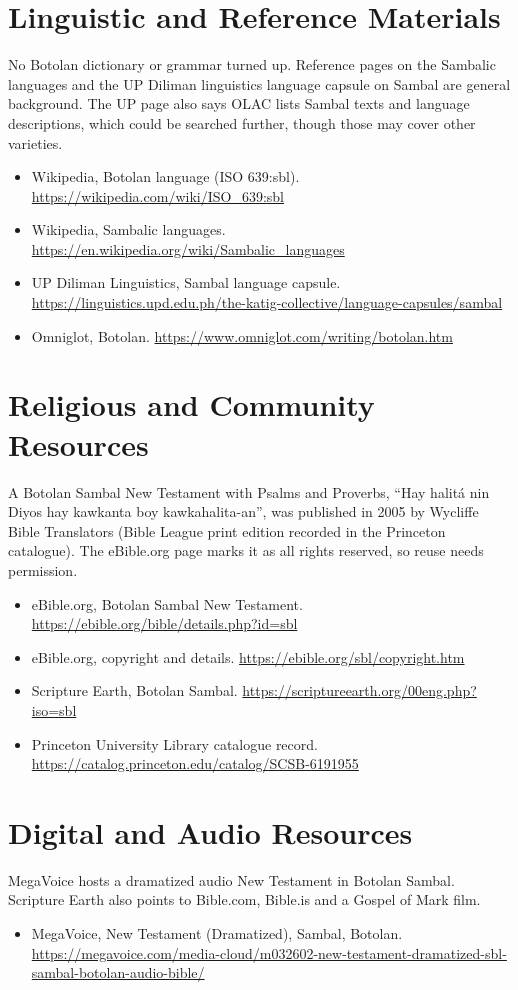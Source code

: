 \documentclass[12pt]{article}
\begin{document}
\section{Linguistic and Reference Materials}
No Botolan dictionary or grammar turned up. Reference pages on the Sambalic languages and the UP Diliman linguistics language capsule on Sambal are general background. The UP page also says OLAC lists Sambal texts and language descriptions, which could be searched further, though those may cover other varieties.
\begin{itemize}
\item Wikipedia, Botolan language (ISO 639:sbl). \url{https://wikipedia.com/wiki/ISO_639:sbl}
\item Wikipedia, Sambalic languages. \url{https://en.wikipedia.org/wiki/Sambalic_languages}
\item UP Diliman Linguistics, Sambal language capsule. \url{https://linguistics.upd.edu.ph/the-katig-collective/language-capsules/sambal}
\item Omniglot, Botolan. \url{https://www.omniglot.com/writing/botolan.htm}
\end{itemize}

\section{Religious and Community Resources}
A Botolan Sambal New Testament with Psalms and Proverbs, ``Hay halit\'a nin Diyos hay kawkanta boy kawkahalita-an'', was published in 2005 by Wycliffe Bible Translators (Bible League print edition recorded in the Princeton catalogue). The eBible.org page marks it as all rights reserved, so reuse needs permission.
\begin{itemize}
\item eBible.org, Botolan Sambal New Testament. \url{https://ebible.org/bible/details.php?id=sbl}
\item eBible.org, copyright and details. \url{https://ebible.org/sbl/copyright.htm}
\item Scripture Earth, Botolan Sambal. \url{https://scriptureearth.org/00eng.php?iso=sbl}
\item Princeton University Library catalogue record. \url{https://catalog.princeton.edu/catalog/SCSB-6191955}
\end{itemize}

\section{Digital and Audio Resources}
MegaVoice hosts a dramatized audio New Testament in Botolan Sambal. Scripture Earth also points to Bible.com, Bible.is and a Gospel of Mark film.
\begin{itemize}
\item MegaVoice, New Testament (Dramatized), Sambal, Botolan. \url{https://megavoice.com/media-cloud/m032602-new-testament-dramatized-sbl-sambal-botolan-audio-bible/}
\end{itemize}
\end{document}
